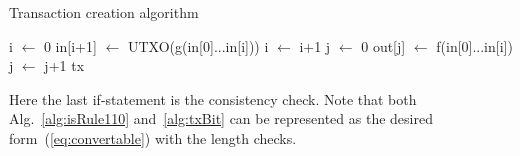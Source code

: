\documentclass[runningheads]{llncs}
\def\Let#1#2{\State #1 $\gets$ #2}
\begin{document}
    \begin{algorithm}[H]
        \caption{Transaction creation algorithm}
        \label{alg:tx}
        \begin{algorithmic}[1]
                \Let{i}{0}
                    \Let{in[i+1]}{UTXO(g(in[0]...in[i]))}
                    \Let{i}{i+1}
                \EndWhile
                \Let{j}{0}
                    \Let{out[j]}{f(in[0]...in[i])}
                    \Let{j}{j+1}
                \EndWhile
                    \Return tx
                \EndIf
            \EndFor
        \end{algorithmic}
    \end{algorithm}
    Here the last if-statement is the consistency check. Note that both
    Alg.~\ref{alg:isRule110} and~\ref{alg:txBit} can be represented as the
    desired form~(\ref{eq:convertable}) with the length checks.
\end{document}
